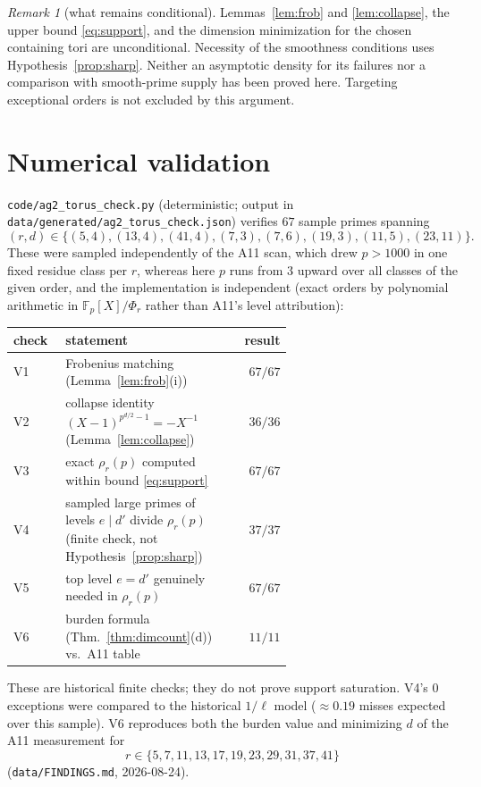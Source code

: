 \documentclass[11pt]{article}
\theoremstyle{remark}
\newtheorem{remark}[theorem]{Remark}
\newcommand{\F}{\mathbb{F}}
\begin{document}
\begin{remark}[what remains conditional]\label{rem:conditional}
Lemmas~\ref{lem:frob} and \ref{lem:collapse}, the upper bound
\eqref{eq:support}, and the dimension minimization for the chosen containing
tori are unconditional. Necessity of the smoothness conditions uses
Hypothesis~\ref{prop:sharp}. Neither an asymptotic density for its failures
nor a comparison with smooth-prime supply has been proved here. Targeting
exceptional orders is not excluded by this argument.
\end{remark}

\section{Numerical validation}\label{sec:numerics}

\texttt{code/ag2\_torus\_check.py} (deterministic; output in
\texttt{data/generated/ag2\_torus\_check.json}) verifies $67$ sample primes
spanning
\[
(r,d)\in\{(5,4),(13,4),(41,4),(7,3),(7,6),(19,3),(11,5),(23,11)\}.
\]
These were sampled independently of the A11 scan, which drew
$p > 1000$ in one fixed residue class per $r$, whereas here $p$ runs from
$3$ upward over all classes of the given order, and the implementation is
independent (exact orders by polynomial arithmetic in $\F_p[X]/\Phi_r$
rather than A11's level attribution):

\begin{center}
\begin{tabular}{@{}lp{0.62\linewidth}r@{}}
\hline
check & statement & result \\
\hline
V1 & Frobenius matching (Lemma~\ref{lem:frob}(i)) & $67/67$ \\
V2 & collapse identity $(X-1)^{p^{d/2}-1} = -X^{-1}$
     (Lemma~\ref{lem:collapse}) & $36/36$ \\
V3 & exact $\rho_r(p)$ computed within bound \eqref{eq:support} & $67/67$ \\
V4 & sampled large primes of levels $e \mid d'$ divide $\rho_r(p)$
     (finite check, not Hypothesis~\ref{prop:sharp}) & $37/37$ \\
V5 & top level $e = d'$ genuinely needed in $\rho_r(p)$ & $67/67$ \\
V6 & burden formula (Thm.~\ref{thm:dimcount}(d)) vs.\ A11 table & $11/11$ \\
\hline
\end{tabular}
\end{center}

These are historical finite checks; they do not prove support saturation.
V4's $0$ exceptions were compared to the historical $1/\ell$ model
($\approx 0.19$ misses expected over this sample). V6 reproduces both the
burden value and minimizing $d$ of the A11 measurement for
\[
r\in\{5,7,11,13,17,19,23,29,31,37,41\}
\]
(\texttt{data/FINDINGS.md}, 2026-08-24).
\end{document}
